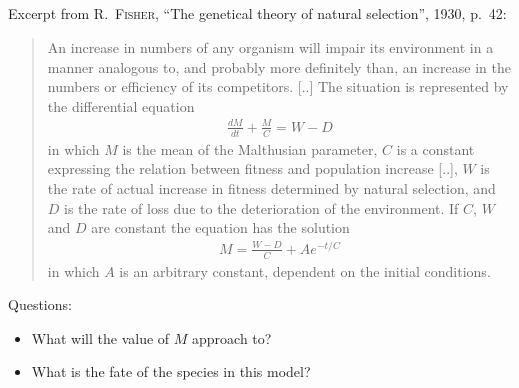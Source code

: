 \documentclass[12pt,a4paper]{article}
\begin{document}
    \subsection{}
    
    Excerpt from
    \textsc{R.~Fisher},
    ``The genetical theory of natural selection'', 1930, p.~42:
    
    \begin{quote}
        \small
        
        An increase in numbers of any organism
        will impair its environment
        in a manner analogous to,
        and probably more definitely than,
        an increase in the numbers or efficiency
        of its competitors.
        [..]
        The situation is represented by
        the differential equation
        \begin{align}
            \frac{d M}{d t} + \frac{M}{C} = W - D
        \end{align}
        in which
        $M$ is the mean of the Malthusian parameter,
        $C$ is a constant expressing the relation
        between fitness and population increase [..],
        $W$ is the rate of actual increase in fitness
        determined by natural selection,
        and $D$ is the rate of loss due to 
        the deterioration of the environment.
        If $C$, $W$ and $D$ are constant
        the equation has the solution
        \begin{align}
            M = \frac{W - D}{C} + A e^{-t / C}
        \end{align}
        in which $A$ is an arbitrary constant,
        dependent on the initial conditions.
    \end{quote}
    
    Questions:
    \begin{itemize}
    \item 
        What will the value of $M$ approach to?
    \item
        What is the fate of the species in this model?
    \end{itemize}

    

    
    \subsection{}
    
\end{document}
